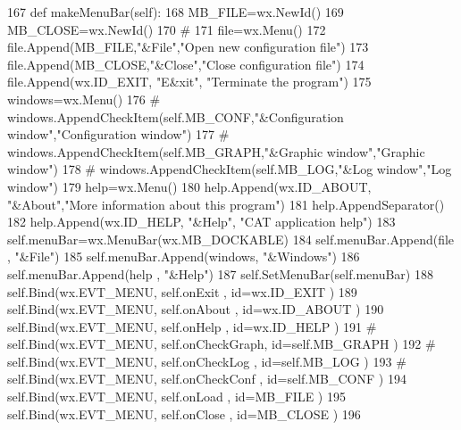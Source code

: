 \begin{DoxyCode}
167     \textcolor{keyword}{def }makeMenuBar(self):
168         MB\_FILE=wx.NewId()
169         MB\_CLOSE=wx.NewId()
170         \textcolor{comment}{#}
171         file=wx.Menu()
172         file.Append(MB\_FILE,\textcolor{stringliteral}{"&File"},\textcolor{stringliteral}{"Open new configuration file"})
173         file.Append(MB\_CLOSE,\textcolor{stringliteral}{"&Close"},\textcolor{stringliteral}{"Close configuration file"})
174         file.Append(wx.ID\_EXIT, \textcolor{stringliteral}{"E&xit"}, \textcolor{stringliteral}{"Terminate the program"})
175         windows=wx.Menu()
176 \textcolor{comment}{#        windows.AppendCheckItem(self.MB\_CONF,"&Configuration window","Configuration window")}
177 \textcolor{comment}{#        windows.AppendCheckItem(self.MB\_GRAPH,"&Graphic window","Graphic window")}
178 \textcolor{comment}{#        windows.AppendCheckItem(self.MB\_LOG,"&Log window","Log window")}
179         help=wx.Menu()
180         help.Append(wx.ID\_ABOUT, \textcolor{stringliteral}{"&About"},\textcolor{stringliteral}{"More information about this program"})
181         help.AppendSeparator()
182         help.Append(wx.ID\_HELP, \textcolor{stringliteral}{"&Help"}, \textcolor{stringliteral}{"CAT application help"})
183         self.menuBar=wx.MenuBar(wx.MB\_DOCKABLE)
184         self.menuBar.Append(file   , \textcolor{stringliteral}{"&File"})
185         self.menuBar.Append(windows, \textcolor{stringliteral}{"&Windows"})
186         self.menuBar.Append(help   , \textcolor{stringliteral}{"&Help"})
187         self.SetMenuBar(self.menuBar)
188         self.Bind(wx.EVT\_MENU, self.onExit      , id=wx.ID\_EXIT )
189         self.Bind(wx.EVT\_MENU, self.onAbout     , id=wx.ID\_ABOUT )
190         self.Bind(wx.EVT\_MENU, self.onHelp      , id=wx.ID\_HELP )
191 \textcolor{comment}{#        self.Bind(wx.EVT\_MENU, self.onCheckGraph, id=self.MB\_GRAPH )}
192 \textcolor{comment}{#        self.Bind(wx.EVT\_MENU, self.onCheckLog  , id=self.MB\_LOG   )}
193 \textcolor{comment}{#        self.Bind(wx.EVT\_MENU, self.onCheckConf , id=self.MB\_CONF  )}
194         self.Bind(wx.EVT\_MENU, self.onLoad      , id=MB\_FILE  )
195         self.Bind(wx.EVT\_MENU, self.onClose     , id=MB\_CLOSE  )
196         
\end{DoxyCode}
\mbox{\label{classAppFrame_1_1AppFrame_a87b3da963f037a94fe92a9209a6d1302}} 

